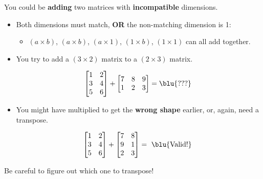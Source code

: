         You could be \textbf{adding} two matrices with \textbf{incompatible} dimensions.
        \begin{itemize}
            \item Both dimensions must match, \textbf{OR} the non-matching dimension is 1:
            
            \begin{itemize}
                \item $(a \times b)$, $(a \times b)$, $(a \times 1)$, $(1 \times b)$, $(1 \times 1)$ can all add together.
            \end{itemize}
            \item \miniex You try to add a $(3 \times 2)$ matrix to a $(2 \times 3)$ matrix.
            
            \begin{equation*}
                \begin{bmatrix}
                  1&2\\3&4\\5&6
                \end{bmatrix}
                +
                \begin{bmatrix}
                  7&8&9\\1&2&3
                \end{bmatrix}
                = \text{\blu{???} }
            \end{equation*}
        
            \item You might have multiplied to get the \textbf{wrong shape} earlier, or, again, need a transpose.
            
            \begin{equation*}
                \begin{bmatrix}
                  1&2\\3&4\\5&6
                \end{bmatrix}
                +
                \begin{bmatrix}
                  7&8\\9&1\\2&3
                \end{bmatrix}
                = \text{ \blu{Valid!} }
            \end{equation*}
        \end{itemize}
        
        Be careful to figure out which one to transpose!
        
